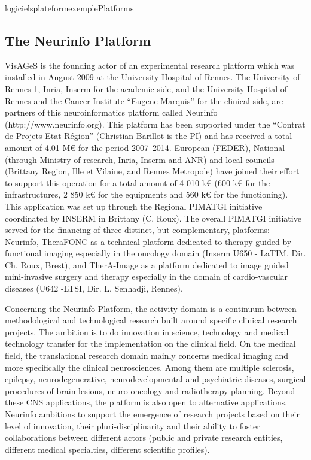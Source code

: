 \documentclass{ra2018}
\begin{document}
 \begin{module}{logiciels}{plateformexemple}{Platforms}  

\subsection{The Neurinfo Platform}

VisAGeS is the founding actor of an experimental research platform which was installed in August 2009 at the University Hospital of Rennes. The University of Rennes 1, Inria, Inserm for the academic side, and the University Hospital of Rennes and the Cancer Institute “Eugene Marquis” for the clinical side, are partners of this neuroinformatics platform called Neurinfo (http://www.neurinfo.org). This platform has been supported under the “Contrat de Projets Etat-Région” (Christian Barillot is the PI) and has received a total amount of 4.01 M€ for the period 2007–2014. European (FEDER), National (through Ministry of research, Inria, Inserm and ANR) and local councils (Brittany Region, Ille et Vilaine, and Rennes Metropole) have joined their effort to support this operation for a total amount of 4 010 k€ (600 k€ for the infrastructures, 2 850 k€ for the equipments and 560 k€ for the functioning). This application was set up through the Regional PIMATGI initiative coordinated by INSERM in Brittany (C. Roux). The overall PIMATGI initiative served for the financing of three distinct, but complementary, platforms: Neurinfo, TheraFONC as a technical platform dedicated to therapy guided by functional imaging especially in the oncology domain (Inserm U650 - LaTIM, Dir. Ch. Roux, Brest), and TherA-Image as a platform dedicated to image guided mini-invasive surgery and therapy especially in the domain of cardio-vascular diseases (U642 -LTSI, Dir. L. Senhadji, Rennes).

Concerning the Neurinfo Platform, the activity domain is a continuum between methodological and technological research built around specific clinical research projects. The ambition is to do innovation in science, technology and medical technology transfer for the implementation on the clinical field. On the medical field, the translational research domain mainly concerns medical imaging and more specifically the clinical neurosciences. Among them are multiple sclerosis, epilepsy, neurodegenerative, neurodevelopmental and psychiatric diseases, surgical procedures of brain lesions, neuro-oncology and radiotherapy planning. Beyond these CNS applications, the platform is also open to alternative applications. Neurinfo ambitions to support the emergence of research projects based on their level of innovation, their pluri-disciplinarity and their ability to foster collaborations between different actors (public and private research entities, different medical specialties, different scientific profiles).


\end{module}
\end{document}
